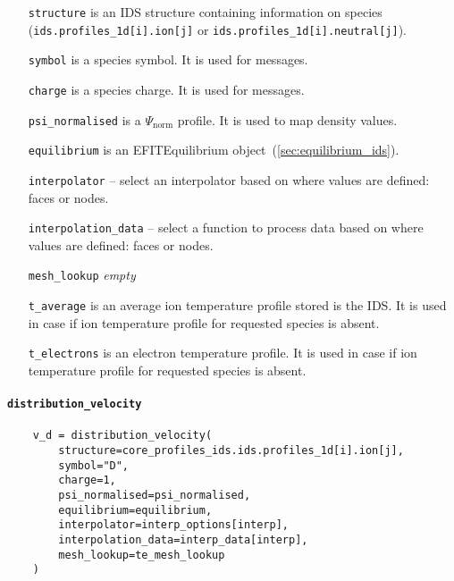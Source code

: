 \documentclass[../../main.tex]{subfiles}
\begin{document}
\begin{itemize}[align=left]
    \item[\texttt{structure}] is an IDS structure containing information on species (\texttt{ids.profiles\_1d[i].ion[j]} or \texttt{ids.profiles\_1d[i].neutral[j]}).
    \item[\texttt{symbol}] is a species symbol. It is used for messages.
    \item[\texttt{charge}] is a species charge. It is used for messages.
    \item[\texttt{psi\_normalised}] is a $\Psi_\text{norm}$ profile. It is used to map density values.
    \item[\texttt{equilibrium}] is an EFITEquilibrium object~(\cref{sec:equilibrium_ids}).
    \item[\texttt{interpolator}] -- select an interpolator based on where values are defined: faces or nodes.
    \item[\texttt{interpolation\_data}] -- select a function to process data based on where values are defined: faces or nodes.
    \item[\texttt{mesh\_lookup}] \emph{empty}
    \item[\texttt{t\_average}] is an average ion temperature profile stored is the IDS. It is used in case if ion temperature profile for requested species is absent.
    \item[\texttt{t\_electrons}] is an electron temperature profile. It is used in case if ion temperature profile for requested species is absent.
\end{itemize}

\paragraph{\texttt{distribution\_velocity}}%

\begin{verbatim}
    v_d = distribution_velocity(
        structure=core_profiles_ids.ids.profiles_1d[i].ion[j],
        symbol="D",
        charge=1,
        psi_normalised=psi_normalised,
        equilibrium=equilibrium,
        interpolator=interp_options[interp],
        interpolation_data=interp_data[interp],
        mesh_lookup=te_mesh_lookup
    )
\end{verbatim}
\end{document}
